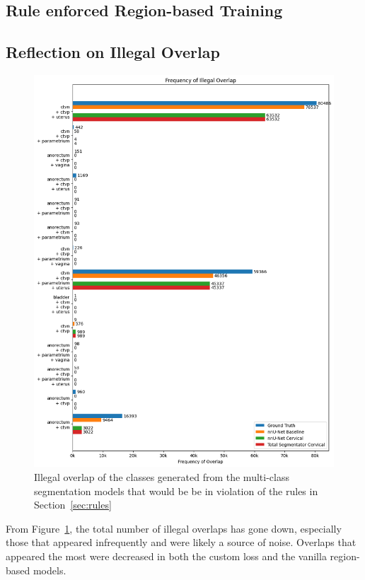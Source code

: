 \documentclass[11pt,twoside]{report}
\begin{document}
\subsection{Rule enforced Region-based Training}
\clearpage

\subsection{Reflection on Illegal Overlap}

\begin{figure}[H]
  \centering
  \includegraphics[height=.7\textheight]{../../research/source/code/nnUNet/3_gt_engineering/overlap_frequency_combined.png}
  \caption{Illegal overlap of the classes generated from the multi-class segmentation models that would be be in violation of the rules in Section~\ref{sec:rules}}\label{fig:illegal-overlap-total}
\end{figure}

From Figure~\ref{fig:illegal-overlap-total}, the total number of illegal overlaps has gone down, especially those that appeared infrequently and were likely a source of noise. Overlaps that appeared the most were decreased in both the custom loss and the vanilla region-based models.
\end{document}
